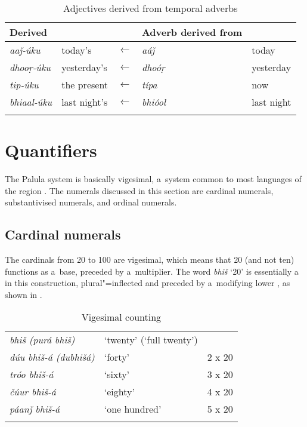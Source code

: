 \begin{table}[ht]
\caption{Adjectives derived from temporal adverbs}

\begin{tabularx}{\textwidth}{ Q l l Q l }
\lsptoprule
Derived  &
&
&
Adverb derived from &
\\\hline
\textit{aaǰ-úku} &
today's &
$\leftarrow$ &
\textit{aáǰ} &
today\\
\textit{dhooṛ-úku} &
yesterday's &
$\leftarrow$ &
\textit{dhoóṛ} &
yesterday\\
\textit{tip-úku} &
the present &
$\leftarrow$ &
\textit{típa} &
now\\
\textit{bhiaal-úku} &
last night's &
$\leftarrow$ &
\textit{bhióol} &
last night\\\lspbottomrule
\end{tabularx}
\label{tab:6-6}
\end{table}


\section{Quantifiers}
\label{sec:6-4}

The Palula  system is basically vigesimal, a~system common to most languages of the region \citep[823]{bashir2003}. The numerals discussed in this section are cardinal numerals, substantivised numerals, and ordinal numerals.


\subsection{Cardinal numerals}
\label{subsec:6-4-1}

The cardinals from 20 to 100 are vigesimal, which means that 20 (and not ten) functions as a~base, preceded by a~multiplier. The word \textit{bhiš} `20' is essentially a~ in this construction, plural"=inflected and preceded by a~modifying lower , as shown in . 


\begin{table}
\caption{Vigesimal counting}
\begin{tabularx}{\textwidth}{ Q Q l@{\hspace{50pt}} }
\lsptoprule
\textit{bhiš (purá bhiš)} &
`twenty' (`full twenty') &
\\
\textit{dúu bhiš-á (dubhišá)} &
`forty' &
2 x 20\\
\textit{tróo bhiš-á} &
`sixty' &
3 x 20\\
\textit{čúur bhiš-á} &
`eighty' &
4 x 20\\
\textit{páanǰ bhiš-á} &
`one hundred' &
5 x 20\\\lspbottomrule
\end{tabularx}
\label{tab:6-vig}
\end{table}


